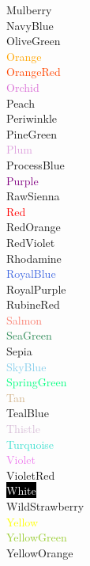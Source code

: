 \documentclass{article}
\begin{document}
\textcolor{Mulberry}{Mulberry}\\
\textcolor{NavyBlue}{NavyBlue}\\
\textcolor{OliveGreen}{OliveGreen}\\
\textcolor{Orange}{Orange}\\
\textcolor{OrangeRed}{OrangeRed}\\
\textcolor{Orchid}{Orchid}\\
\textcolor{Peach}{Peach}\\
\textcolor{Periwinkle}{Periwinkle}\\
\textcolor{PineGreen}{PineGreen}\\
\textcolor{Plum}{Plum}\\
\textcolor{ProcessBlue}{ProcessBlue}\\
\textcolor{Purple}{Purple}\\
\textcolor{RawSienna}{RawSienna}\\
\textcolor{Red}{Red}\\
\textcolor{RedOrange}{RedOrange}\\
\textcolor{RedViolet}{RedViolet}\\
\textcolor{Rhodamine}{Rhodamine}\\
\textcolor{RoyalBlue}{RoyalBlue}\\
\textcolor{RoyalPurple}{RoyalPurple}\\
\textcolor{RubineRed}{RubineRed}\\
\textcolor{Salmon}{Salmon}\\
\textcolor{SeaGreen}{SeaGreen}\\
\textcolor{Sepia}{Sepia}\\
\textcolor{SkyBlue}{SkyBlue}\\
\textcolor{SpringGreen}{SpringGreen}\\
\textcolor{Tan}{Tan}\\
\textcolor{TealBlue}{TealBlue}\\
\textcolor{Thistle}{Thistle}\\
\textcolor{Turquoise}{Turquoise}\\
\textcolor{Violet}{Violet}\\
\textcolor{VioletRed}{}VioletRed\\
\colorbox{black}{\textcolor{White}{White}}\\
\textcolor{WildStrawberry}{WildStrawberry}\\
\textcolor{Yellow}{Yellow}\\
\textcolor{YellowGreen}{YellowGreen}\\
\textcolor{YellowOrange}{YellowOrange}\\
	
\end{document}
